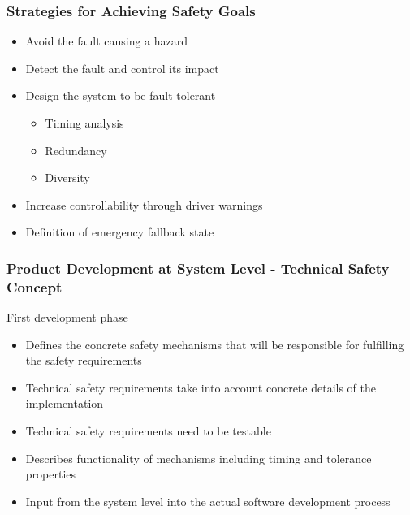 \documentclass[aspectratio=169]{beamer}
\newif\iftransitions
\newcommand{\cpause}{\iftransitions \pause \fi}
\begin{document}
\begin{frame}

  \frametitle{Strategies for Achieving Safety Goals}
  
  \begin{itemize}
    \item Avoid the fault causing a hazard \cpause
    \item Detect the fault and control its impact \cpause
    \item Design the system to be fault-tolerant \cpause
    \begin{itemize}
      \item Timing analysis \cpause
      \item Redundancy \cpause
      \item Diversity
    \end{itemize} \cpause
    \item Increase controllability through driver warnings \cpause
    \item Definition of emergency fallback state
  \end{itemize}
  

\end{frame}

\begin{frame}
  \frametitle{Product Development at System Level - Technical Safety Concept}
  
  First development phase \cpause
  \begin{itemize}
  \item Defines the concrete safety mechanisms that will be responsible for fulfilling the safety requirements \cpause
  \item Technical safety requirements take into account concrete details of the implementation \cpause
  \item Technical safety requirements need to be testable \cpause
  \item Describes functionality of mechanisms including timing and tolerance properties \cpause
  \item Input from the system level into the actual software development process
  \end{itemize}
  
  
\end{frame}
\end{document}
